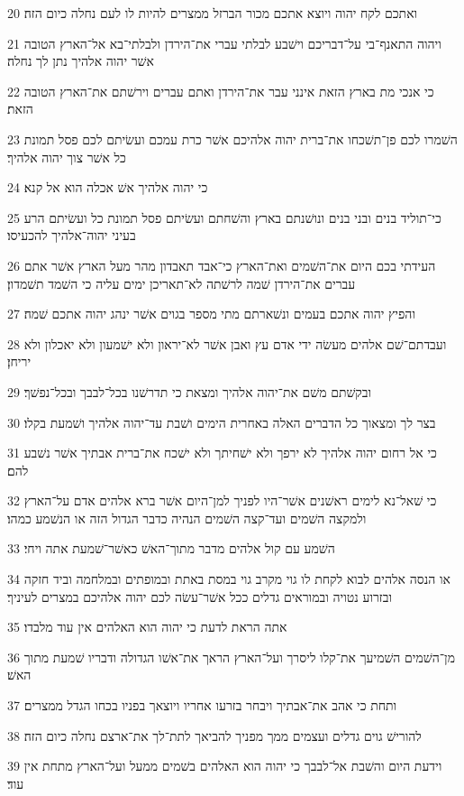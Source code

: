 \par 20 ואתכם לקח יהוה ויוצא אתכם מכור הברזל ממצרים להיות לו לעם נחלה כיום הזה׃
\par 21 ויהוה התאנף־בי על־דבריכם וישׁבע לבלתי עברי את־הירדן ולבלתי־בא אל־הארץ הטובה אשׁר יהוה אלהיך נתן לך נחלה׃
\par 22 כי אנכי מת בארץ הזאת אינני עבר את־הירדן ואתם עברים וירשׁתם את־הארץ הטובה הזאת׃
\par 23 השׁמרו לכם פן־תשׁכחו את־ברית יהוה אלהיכם אשׁר כרת עמכם ועשׂיתם לכם פסל תמונת כל אשׁר צוך יהוה אלהיך׃
\par 24 כי יהוה אלהיך אשׁ אכלה הוא אל קנא׃
\par 25 כי־תוליד בנים ובני בנים ונושׁנתם בארץ והשׁחתם ועשׂיתם פסל תמונת כל ועשׂיתם הרע בעיני יהוה־אלהיך להכעיסו׃
\par 26 העידתי בכם היום את־השׁמים ואת־הארץ כי־אבד תאבדון מהר מעל הארץ אשׁר אתם עברים את־הירדן שׁמה לרשׁתה לא־תאריכן ימים עליה כי השׁמד תשׁמדון׃
\par 27 והפיץ יהוה אתכם בעמים ונשׁארתם מתי מספר בגוים אשׁר ינהג יהוה אתכם שׁמה׃
\par 28 ועבדתם־שׁם אלהים מעשׂה ידי אדם עץ ואבן אשׁר לא־יראון ולא ישׁמעון ולא יאכלון ולא יריחן׃
\par 29 ובקשׁתם משׁם את־יהוה אלהיך ומצאת כי תדרשׁנו בכל־לבבך ובכל־נפשׁך׃
\par 30 בצר לך ומצאוך כל הדברים האלה באחרית הימים ושׁבת עד־יהוה אלהיך ושׁמעת בקלו׃
\par 31 כי אל רחום יהוה אלהיך לא ירפך ולא ישׁחיתך ולא ישׁכח את־ברית אבתיך אשׁר נשׁבע להם׃
\par 32 כי שׁאל־נא לימים ראשׁנים אשׁר־היו לפניך למן־היום אשׁר ברא אלהים אדם על־הארץ ולמקצה השׁמים ועד־קצה השׁמים הנהיה כדבר הגדול הזה או הנשׁמע כמהו׃
\par 33 השׁמע עם קול אלהים מדבר מתוך־האשׁ כאשׁר־שׁמעת אתה ויחי׃
\par 34 או הנסה אלהים לבוא לקחת לו גוי מקרב גוי במסת באתת ובמופתים ובמלחמה וביד חזקה ובזרוע נטויה ובמוראים גדלים ככל אשׁר־עשׂה לכם יהוה אלהיכם במצרים לעיניך׃
\par 35 אתה הראת לדעת כי יהוה הוא האלהים אין עוד מלבדו׃
\par 36 מן־השׁמים השׁמיעך את־קלו ליסרך ועל־הארץ הראך את־אשׁו הגדולה ודבריו שׁמעת מתוך האשׁ׃
\par 37 ותחת כי אהב את־אבתיך ויבחר בזרעו אחריו ויוצאך בפניו בכחו הגדל ממצרים׃
\par 38 להורישׁ גוים גדלים ועצמים ממך מפניך להביאך לתת־לך את־ארצם נחלה כיום הזה׃
\par 39 וידעת היום והשׁבת אל־לבבך כי יהוה הוא האלהים בשׁמים ממעל ועל־הארץ מתחת אין עוד׃
